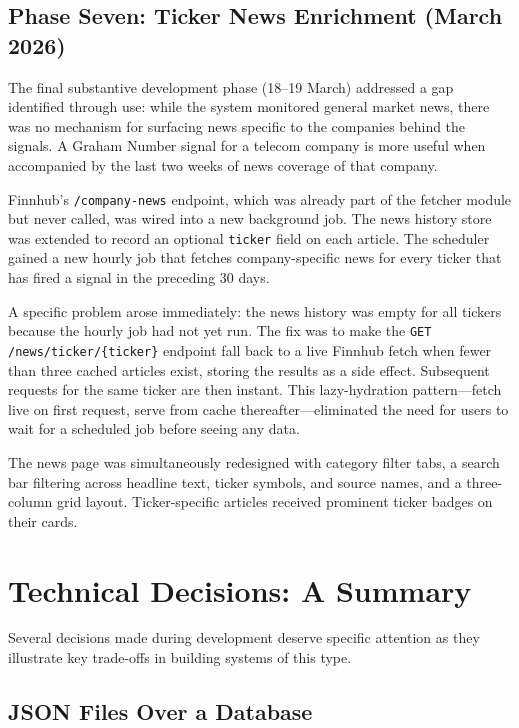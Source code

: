 \documentclass[12pt,a4paper]{article}
\begin{document}
\subsection{Phase Seven: Ticker News Enrichment (March 2026)}

The final substantive development phase (18--19 March) addressed a gap identified through use: while the system monitored general market news, there was no mechanism for surfacing news specific to the companies behind the signals. A Graham Number signal for a telecom company is more useful when accompanied by the last two weeks of news coverage of that company.

Finnhub's \texttt{/company-news} endpoint, which was already part of the fetcher module but never called, was wired into a new background job. The news history store was extended to record an optional \texttt{ticker} field on each article. The scheduler gained a new hourly job that fetches company-specific news for every ticker that has fired a signal in the preceding 30 days.

A specific problem arose immediately: the news history was empty for all tickers because the hourly job had not yet run. The fix was to make the \texttt{GET /news/ticker/\{ticker\}} endpoint fall back to a live Finnhub fetch when fewer than three cached articles exist, storing the results as a side effect. Subsequent requests for the same ticker are then instant. This lazy-hydration pattern---fetch live on first request, serve from cache thereafter---eliminated the need for users to wait for a scheduled job before seeing any data.

The news page was simultaneously redesigned with category filter tabs, a search bar filtering across headline text, ticker symbols, and source names, and a three-column grid layout. Ticker-specific articles received prominent ticker badges on their cards.

\section{Technical Decisions: A Summary}

Several decisions made during development deserve specific attention as they illustrate key trade-offs in building systems of this type.

\subsection{JSON Files Over a Database}
\end{document}
